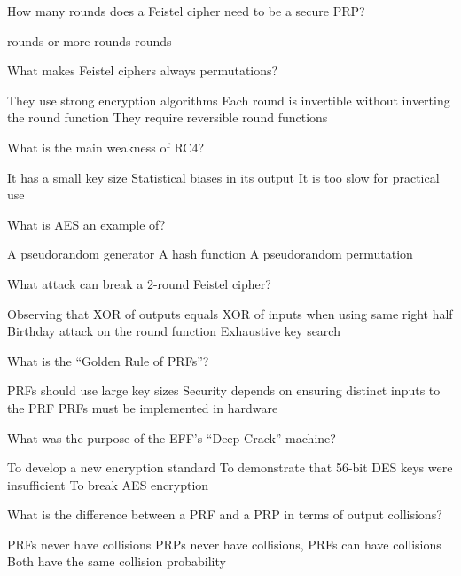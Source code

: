 \documentclass[10pt,a4paper,american]{exam}
\begin{document}
\begin{questions}
	\question How many rounds does a Feistel cipher need to be a secure PRP?
	\begin{randomizechoices}
		 rounds
		 or more rounds
		 rounds
	\end{randomizechoices}

	\question What makes Feistel ciphers always permutations?
	\begin{randomizechoices}
		\choice They use strong encryption algorithms
		\CorrectChoice Each round is invertible without inverting the round function
		\choice They require reversible round functions
	\end{randomizechoices}

	\question What is the main weakness of RC4?
	\begin{randomizechoices}
		\choice It has a small key size
		\CorrectChoice Statistical biases in its output
		\choice It is too slow for practical use
	\end{randomizechoices}

	\question What is AES an example of?
	\begin{randomizechoices}
		\choice A pseudorandom generator
		\choice A hash function
		\CorrectChoice A pseudorandom permutation
	\end{randomizechoices}

	\question What attack can break a 2-round Feistel cipher?
	\begin{randomizechoices}
		\CorrectChoice Observing that XOR of outputs equals XOR of inputs when using same right half
		\choice Birthday attack on the round function
		\choice Exhaustive key search
	\end{randomizechoices}

	\question What is the ``Golden Rule of PRFs''?
	\begin{randomizechoices}
		\choice PRFs should use large key sizes
		\CorrectChoice Security depends on ensuring distinct inputs to the PRF
		\choice PRFs must be implemented in hardware
	\end{randomizechoices}

	\question What was the purpose of the EFF's ``Deep Crack'' machine?
	\begin{randomizechoices}
		\choice To develop a new encryption standard
		\CorrectChoice To demonstrate that 56-bit DES keys were insufficient
		\choice To break AES encryption
	\end{randomizechoices}

	\question What is the difference between a PRF and a PRP in terms of output collisions?
	\begin{randomizechoices}
		\choice PRFs never have collisions
		\CorrectChoice PRPs never have collisions, PRFs can have collisions
		\choice Both have the same collision probability
	\end{randomizechoices}


\end{questions}
\end{document}
